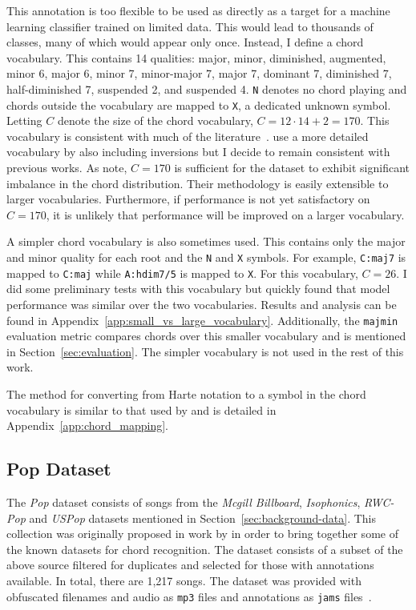 This annotation is too flexible to be used as directly as a target for a machine learning classifier trained on limited data. This would lead to thousands of classes, many of which would appear only once. Instead, I define a chord vocabulary. This contains 14 qualities: major, minor, diminished, augmented, minor 6, major 6, minor 7, minor-major 7, major 7, dominant 7, diminished 7, half-diminished 7, suspended 2, and suspended 4. \texttt{N} denotes no chord playing and chords outside the vocabulary are mapped to \texttt{X}, a dedicated unknown symbol. Letting $C$ denote the size of the chord vocabulary, $C=12\cdot14 + 2 = 170$. This vocabulary is consistent with much of the literature~\citep{StructuredTraining,FourTimelyInsights,ACRLargeVocab1}. \citet{ACRLargeVocab1} use a more detailed vocabulary by also including inversions but I decide to remain consistent with previous works. As \citet{StructuredTraining} note, $C=170$ is sufficient for the dataset to exhibit significant imbalance in the chord distribution. Their methodology is easily extensible to larger vocabularies. Furthermore, if performance is not yet satisfactory on $C=170$, it is unlikely that performance will be improved on a larger vocabulary.

A simpler chord vocabulary is also sometimes used. This contains only the major and minor quality for each root and the \texttt{N} and \texttt{X} symbols. For example, \texttt{C:maj7} is mapped to \texttt{C:maj} while \texttt{A:hdim7/5} is mapped to \texttt{X}. For this vocabulary, $C=26$. I did some preliminary tests with this vocabulary but quickly found that model performance was similar over the two vocabularies. Results and analysis can be found in Appendix~\ref{app:small_vs_large_vocabulary}. Additionally, the \texttt{majmin} evaluation metric compares chords over this smaller vocabulary and is mentioned in Section~\ref{sec:evaluation}. The simpler vocabulary is not used in the rest of this work.

The method for converting from Harte notation to a symbol in the chord vocabulary is similar to that used by \citet{StructuredTraining} and is detailed in Appendix~\ref{app:chord_mapping}.

\subsection{Pop Dataset}

The \emph{Pop} dataset consists of songs from the \emph{Mcgill Billboard}, \emph{Isophonics}, \emph{RWC-Pop} and \emph{USPop} datasets mentioned in Section~\ref{sec:background-data}. This collection was originally proposed in work by \citet{FourTimelyInsights} in order to bring together some of the known datasets for chord recognition. The dataset consists of a subset of the above source filtered for duplicates and selected for those with annotations available. In total, there are 1,217 songs. The dataset was provided with obfuscated filenames and audio as \texttt{mp3} files and annotations as \texttt{jams} files~\citep{JAMS}. 

